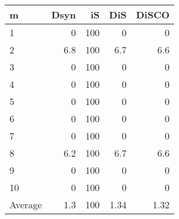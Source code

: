 \begin{tabular}{lrrrr}
  \toprule
m & Dsyn & iS & DiS & DiSCO \\ 
  \midrule
1 & 0 & 100 & 0 & 0 \\ 
  2 & 6.8 & 100 & 6.7 & 6.6 \\ 
  3 & 0 & 100 & 0 & 0 \\ 
  4 & 0 & 100 & 0 & 0 \\ 
  5 & 0 & 100 & 0 & 0 \\ 
  6 & 0 & 100 & 0 & 0 \\ 
  7 & 0 & 100 & 0 & 0 \\ 
  8 & 6.2 & 100 & 6.7 & 6.6 \\ 
  9 & 0 & 100 & 0 & 0 \\ 
  10 & 0 & 100 & 0 & 0 \\ 
  Average & 1.3 & 100 & 1.34 & 1.32 \\ 
   \bottomrule
\end{tabular}
